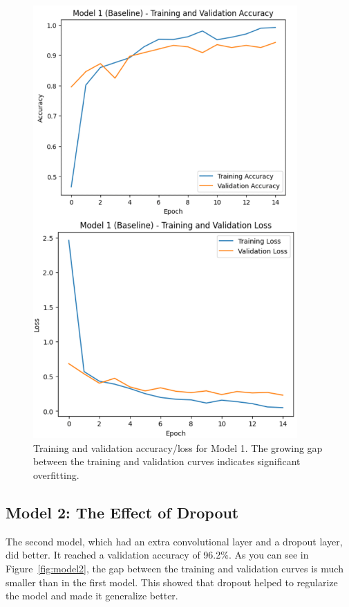 \documentclass[pdflatex,sn-mathphys-num]{sn-jnl}%
\theoremstyle{thmstyleone}%
\theoremstyle{thmstyletwo}%
\theoremstyle{thmstylethree}%
\begin{document}
\begin{figure}[htbp]
\centering
\includegraphics[width=0.9\textwidth]{model1_curves.png}
\caption{Training and validation accuracy/loss for Model 1. The growing gap between the training and validation curves indicates significant overfitting.}\label{fig:model1}
\end{figure}

\subsection{Model 2: The Effect of Dropout}
The second model, which had an extra convolutional layer and a dropout layer, did better. It reached a validation accuracy of 96.2\%. As you can see in Figure~\ref{fig:model2}, the gap between the training and validation curves is much smaller than in the first model. This showed that dropout helped to regularize the model and made it generalize better.
\end{document}
